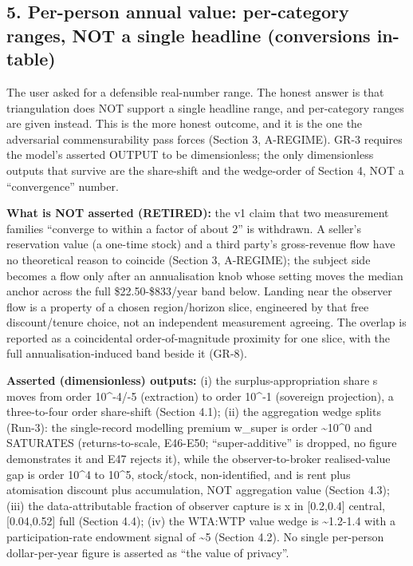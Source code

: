 \documentclass[
  11pt,
]{article}
\begin{document}
\subsection{5. Per-person annual value: per-category ranges, NOT a
single headline (conversions
in-table)}\label{per-person-annual-value-per-category-ranges-not-a-single-headline-conversions-in-table}

The user asked for a defensible real-number range. The honest answer is
that triangulation does NOT support a single headline range, and
per-category ranges are given instead. This is the more honest outcome,
and it is the one the adversarial commensurability pass forces (Section
3, A-REGIME). GR-3 requires the model's asserted OUTPUT to be
dimensionless; the only dimensionless outputs that survive are the
share-shift and the wedge-order of Section 4, NOT a ``convergence''
number.

\textbf{What is NOT asserted (RETIRED):} the v1 claim that two
measurement families ``converge to within a factor of about 2'' is
withdrawn. A seller's reservation value (a one-time stock) and a third
party's gross-revenue flow have no theoretical reason to coincide
(Section 3, A-REGIME); the subject side becomes a flow only after an
annualisation knob whose setting moves the median anchor across the full
\$22.50-\$833/year band below. Landing near the observer flow is a
property of a chosen region/horizon slice, engineered by that free
discount/tenure choice, not an independent measurement agreeing. The
overlap is reported as a coincidental order-of-magnitude proximity for
one slice, with the full annualisation-induced band beside it (GR-8).

\textbf{Asserted (dimensionless) outputs:} (i) the surplus-appropriation
share s moves from order 10\^{}-4/-5 (extraction) to order 10\^{}-1
(sovereign projection), a three-to-four order share-shift (Section 4.1);
(ii) the aggregation wedge splits (Run-3): the single-record modelling
premium w\_super is order \textasciitilde10\^{}0 and SATURATES
(returns-to-scale, E46-E50; ``super-additive'' is dropped, no figure
demonstrates it and E47 rejects it), while the observer-to-broker
realised-value gap is order 10\^{}4 to 10\^{}5, stock/stock,
non-identified, and is rent plus atomisation discount plus accumulation,
NOT aggregation value (Section 4.3); (iii) the data-attributable
fraction of observer capture is x in {[}0.2,0.4{]} central,
{[}0.04,0.52{]} full (Section 4.4); (iv) the WTA:WTP value wedge is
\textasciitilde1.2-1.4 with a participation-rate endowment signal of
\textasciitilde5 (Section 4.2). No single per-person dollar-per-year
figure is asserted as ``the value of privacy''.
\end{document}
